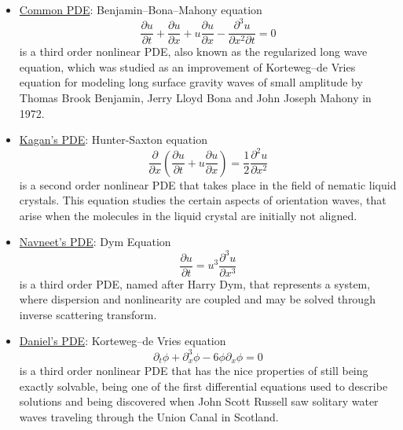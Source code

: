 \newcommand{\assignmentDate}{October 28th, 2019}



\begin{itemize}
	\item \underline{Common PDE}: Benjamin–Bona–Mahony equation
		\begin{equation}
			\frac{\partial u}{\partial t} + \frac{\partial u}{\partial x} + u \frac{\partial u}{\partial x} - \frac{\partial ^3 u}{\partial x^2 \partial t} = 0
		\end{equation}
		is a third order nonlinear PDE, also known as the regularized long wave equation, which was studied as an improvement of Korteweg–de Vries equation for modeling long surface gravity waves of small amplitude by Thomas Brook Benjamin, Jerry Lloyd Bona and John Joseph Mahony in 1972.
	
	\item \underline{Kagan's PDE}: Hunter-Saxton equation
		\begin{equation}
			\frac{\partial}{\partial x} \left( \frac{\partial u }{\partial t} + u \frac{\partial u}{\partial x} \right) = \frac{1}{2} \frac{\partial ^2 u}{\partial x^2}
		\end{equation}
		is a second order nonlinear PDE that takes place in the field of nematic liquid crystals. This equation studies the certain aspects of orientation waves, that arise when the molecules in the liquid crystal are initially not aligned.
		
	\item \underline{Navneet's PDE}: Dym Equation
		\begin{equation}
			\frac{\partial u}{\partial t} = u^3 \frac{\partial^3 u}{\partial x^3}
		\end{equation}
		is a third order PDE, named after Harry Dym, that represents a system, where dispersion and nonlinearity are coupled and may be solved through inverse scattering transform. 
		
	\item \underline{Daniel's PDE}: Korteweg–de Vries equation
		\begin{equation}
			\partial_t\phi+\partial_x^3\phi-6\phi\partial_x\phi=0
		\end{equation}
		is a third order nonlinear PDE that has the nice properties of still being exactly solvable, being one of the first differential equations used to describe solutions and being discovered when John Scott Russell saw solitary water waves traveling through the Union Canal in Scotland.
		
\end{itemize}
